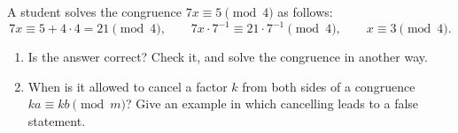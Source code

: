A student solves the congruence $7x\equiv5\pmod4$ as follows:
\[7x\equiv5+4\cdot4=21\pmod4,\qquad 7x\cdot7^{-1}\equiv21\cdot7^{-1}\pmod4,\qquad x\equiv3\pmod4.\]
\begin{enumerate}
\item[(a)] Is the answer correct? Check it, and solve the congruence in another way.
\item[(b)] When is it allowed to cancel a factor $k$ from both sides of a congruence $ka\equiv kb\pmod m$? Give an example in which cancelling leads to a false statement.
\end{enumerate}
